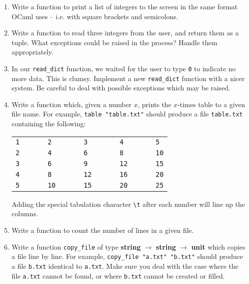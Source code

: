 \documentclass[]{book}
\newcommand\upquote[1]{\textquotesingle#1\textquotesingle}
\begin{document}
\begin{enumerate}
\item Write a function to print a list of integers to the screen in the same format OCaml uses -- i.e. with square brackets and semicolons. 
\item Write a function to read three integers from the user, and return them as a tuple. What exceptions could be raised in the process? Handle them appropriately.
\item In our \texttt{read\_dict} function, we waited for the user to type \texttt{0} to indicate no more data. This is clumsy. Implement a new \texttt{read\_dict} function with a nicer system. Be careful to deal with possible exceptions which may be raised.
\item Write a function which, given a number $x$, prints the $x$-times table to a given file name. For example, \texttt{table\! "table.txt"} should produce a file \texttt{table.txt} containing the following:

\vspace{1mm}
\begin{tabular}{lllll}
 \verb!1! & \verb!     2! & \verb!     3! & \verb!     4! & \verb!     5!\\
 \verb!2! & \verb!     4! & \verb!     6! & \verb!     8! & \verb!     10!\\
 \verb!3! & \verb!     6! & \verb!     9! & \verb!     12! & \verb!     15!\\
 \verb!4! & \verb!     8! & \verb!     12! & \verb!     16! & \verb!     20!\\
 \verb!5! & \verb!     10! & \verb!     15! & \verb!     20! & \verb!     25!
\end{tabular}
\vspace{1mm}

\noindent Adding the special tabulation character \texttt{\upquote{\textbackslash t}} after each number will line up the columns.
\item Write a function to count the number of lines in a given file.
\item Write a function \texttt{copy\_file} of type \textsf{\textbf{string} $\rightarrow$ \textbf{string} $\rightarrow$ \textbf{unit}} which copies a file line by line. For example, \texttt{copy\_file\! "a.txt"\! "b.txt"} should produce a file \texttt{b.txt} identical to \texttt{a.txt}. Make sure you deal with the case where the file \texttt{a.txt} cannot be found, or where \texttt{b.txt} cannot be created or filled. 
\end{enumerate}
\end{document}
